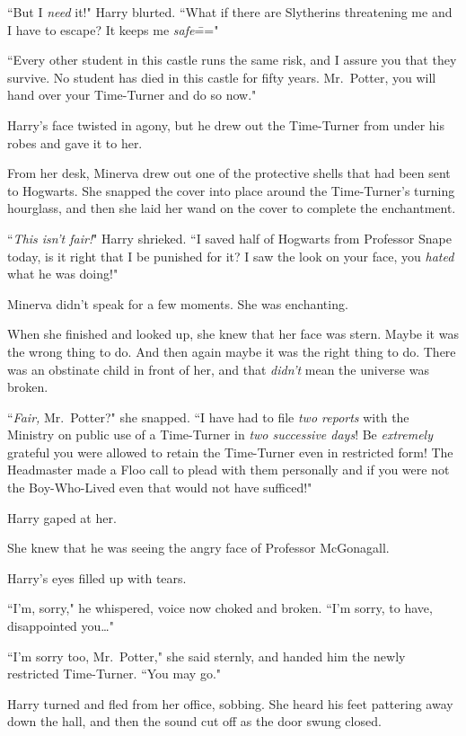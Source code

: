 ``But I \emph{need} it!" Harry blurted. ``What if there are Slytherins threatening me and I have to escape? It keeps me \emph{safe}\==="

``Every other student in this castle runs the same risk, and I assure you that they survive. No student has died in this castle for fifty years. Mr.~Potter, you will hand over your Time-Turner and do so now."

Harry's face twisted in agony, but he drew out the Time-Turner from under his robes and gave it to her.

From her desk, Minerva drew out one of the protective shells that had been sent to Hogwarts. She snapped the cover into place around the Time-Turner's turning hourglass, and then she laid her wand on the cover to complete the enchantment.

``\emph{This isn't fair!}" Harry shrieked. ``I saved half of Hogwarts from Professor Snape today, is it right that I be punished for it? I saw the look on your face, you \emph{hated} what he was doing!"

Minerva didn't speak for a few moments. She was enchanting.

When she finished and looked up, she knew that her face was stern. Maybe it was the wrong thing to do. And then again maybe it was the right thing to do. There was an obstinate child in front of her, and that \emph{didn't} mean the universe was broken.

``\emph{Fair,} Mr.~Potter?" she snapped. ``I have had to file \emph{two reports} with the Ministry on public use of a Time-Turner in \emph{two successive days}! Be \emph{extremely} grateful you were allowed to retain the Time-Turner even in restricted form! The Headmaster made a Floo call to plead with them personally and if you were not the Boy-Who-Lived even that would not have sufficed!"

Harry gaped at her.

She knew that he was seeing the angry face of Professor McGonagall.

Harry's eyes filled up with tears.

``I'm, sorry," he whispered, voice now choked and broken. ``I'm sorry, to have, disappointed you{\ldots}"

``I'm sorry too, Mr.~Potter," she said sternly, and handed him the newly restricted Time-Turner. ``You may go."

Harry turned and fled from her office, sobbing. She heard his feet pattering away down the hall, and then the sound cut off as the door swung closed.

